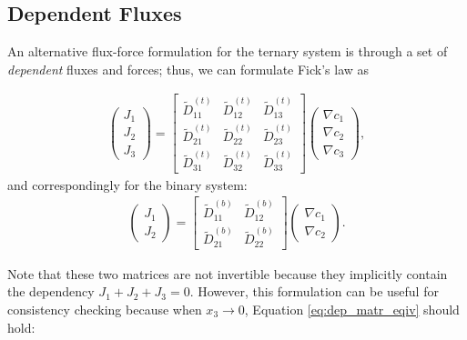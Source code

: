\subsection{Dependent Fluxes}\label{sec:dependent}

An alternative flux-force formulation for the ternary system is through a set of \textit{dependent} fluxes and forces; thus, we can formulate Fick's law as

\begin{equation}
    \begin{split}
        \begin{pmatrix}J_1 \\ J_2 \\ J_3 \end{pmatrix} = \begin{bmatrix}\tilde{D}_{11}^{(t)} & \tilde{D}_{12}^{(t)} & \tilde{D}_{13}^{(t)} \\ \tilde{D}_{21}^{(t)} & \tilde{D}_{22}^{(t)} & \tilde{D}_{23}^{(t)} \\ \tilde{D}_{31}^{(t)} & \tilde{D}_{32}^{(t)} & \tilde{D}_{33}^{(t)} \end{bmatrix} \begin{pmatrix}\nabla c_1 \\ \nabla c_2 \\ \nabla c_3\end{pmatrix},
    \end{split}
\end{equation}
and correspondingly for the binary system:
\begin{equation}
    \begin{split}
        \begin{pmatrix}J_1 \\ J_2\end{pmatrix} = \begin{bmatrix}\tilde{D}_{11}^{(b)} & \tilde{D}_{12}^{(b)} \\ \tilde{D}_{21}^{(b)} & \tilde{D}_{22}^{(b)}\end{bmatrix} \begin{pmatrix}\nabla c_1 \\ \nabla c_2\end{pmatrix}.
    \end{split}
\end{equation}

Note that these two matrices are not invertible because they implicitly contain the dependency $J_1 + J_2 + J_3 = 0$. However, this formulation can be useful for consistency checking because when $x_3 \to 0$, Equation \eqref{eq:dep_matr_eqiv} should hold:


